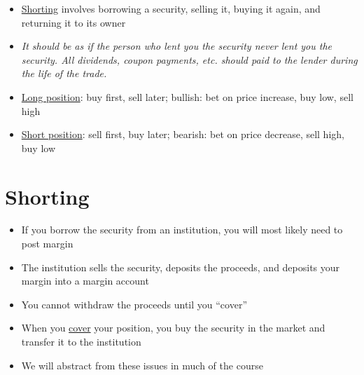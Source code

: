 \documentclass{beamer}
\begin{document}
\begin{frame}{}
\begin{itemize}
\item \underline{Shorting} involves borrowing a security, selling it, buying it again, and returning it to its owner
\item \textit{It should be as if the person who lent you the security never lent you the security. All dividends, coupon payments, etc. should paid to the lender during the life of the trade.}
\item \underline{Long position}: buy first, sell later; bullish: bet on price increase, buy low, sell high
\item \underline{Short position}: sell first, buy later; bearish: bet on price decrease, sell high, buy low
\end{itemize}
\end{frame}

\section{Shorting}
\begin{frame}{}
\begin{itemize}
\item If you borrow the security from an institution, you will most likely need to post margin 
\item The institution sells the security, deposits the proceeds, and deposits your margin into a margin account 
\item You cannot withdraw the proceeds until you ``cover'' 
\item When you \underline{cover} your position, you buy the security in the market and transfer it to the institution 
\item We will abstract from these issues in much of the course
\end{itemize}
\end{frame}
\end{document}
